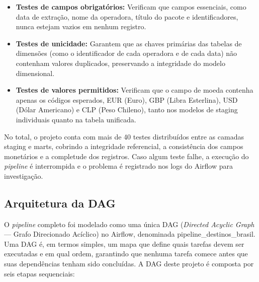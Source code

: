 \begin{itemize}
    \item \textbf{Testes de campos obrigatórios:} Verificam que campos essenciais,
    como data de extração, nome da operadora, título do pacote e identificadores,
    nunca estejam vazios em nenhum registro.
    \item \textbf{Testes de unicidade:} Garantem que as chaves primárias das tabelas de
    dimensões (como o identificador de cada operadora e de cada data) não contenham
    valores duplicados, preservando a integridade do modelo dimensional.
    \item \textbf{Testes de valores permitidos:} Verificam que o campo de moeda
    contenha apenas os códigos esperados, EUR (Euro), GBP (Libra Esterlina), USD
    (Dólar Americano) e CLP (Peso Chileno), tanto nos modelos de staging individuais
    quanto na tabela unificada.
\end{itemize}

No total, o projeto conta com mais de 40 testes distribuídos entre as camadas staging
e marts, cobrindo a integridade referencial, a consistência dos campos monetários e a
completude dos registros. Caso algum teste falhe, a execução do \textit{pipeline} é
interrompida e o problema é registrado nos logs do Airflow para investigação.


\subsection{Arquitetura da DAG}

O \textit{pipeline} completo foi modelado como uma única DAG (\textit{Directed Acyclic Graph} — Grafo Direcionado Acíclico) no Airflow, denominada pipeline\_destinos\_brasil. Uma DAG é, em termos simples, um mapa que define quais tarefas devem ser executadas e em qual ordem, garantindo que nenhuma tarefa comece antes que suas dependências tenham sido concluídas. A DAG deste projeto é composta por seis etapas sequenciais:

